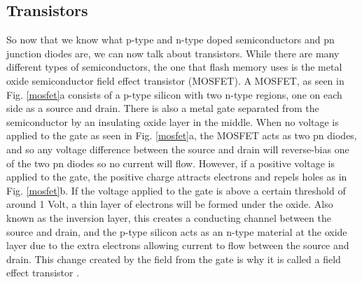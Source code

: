 \documentclass[ notitlepage, numerical, 11pt]{revtex4-1} %
\begin{document}
\subsection{Transistors}
So now that we know what p-type and n-type doped semiconductors and pn junction diodes are, we can now talk about transistors. While there are many different types of semiconductors, the one that flash memory uses is the metal oxide semiconductor field effect transistor (MOSFET). A MOSFET, as seen in Fig. \ref{mosfet}a consists of a p-type silicon with two n-type regions, one on each side as a source and drain. There is also a metal gate separated from the semiconductor by an insulating oxide layer in the middle. When no voltage is applied to the gate as seen in Fig. \ref{mosfet}a, the MOSFET acts as two pn diodes, and so any voltage difference between the source and drain will reverse-bias one of the two pn diodes so no current will flow. However, if a positive voltage is applied to the gate, the positive charge attracts electrons and repels holes as in Fig. \ref{mosfet}b. If the voltage applied to the gate is above a certain threshold of around 1 Volt, a thin layer of electrons will be formed under the oxide. Also known as the inversion layer, this creates a conducting channel between the source and drain, and the p-type silicon acts as an n-type material at the oxide layer due to the extra electrons allowing current to flow between the source and drain. This change created by the field from the gate is why it is called a field effect transistor \cite{modernPhysics}.
\end{document}
